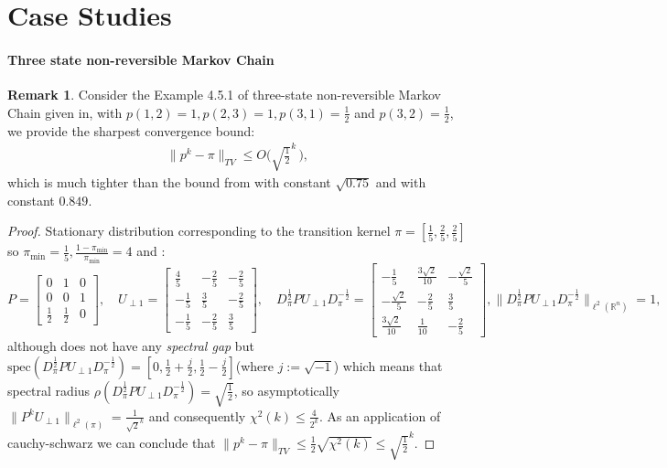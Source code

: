 \documentclass[preprint]{imsart}
\theoremstyle{plain}
\theoremstyle{definition}
\newtheorem{remark}{Remark}
\begin{document}
\section{Case Studies}
\label{sec:case_studies}
\paragraph{Three state non-reversible Markov Chain}
\begin{remark}
\label{rmk:three_state_non_rev}
Consider the Example 4.5.1 of three-state non-reversible Markov Chain given in, \cite{choi2017analysis} with $p(1,2)=1, p(2,3)=1, p(3,1)=\tfrac{1}{2}$ and $p(3,2)=\tfrac{1}{2}$,  
we provide the sharpest convergence bound:
\begin{align}
    \|p^{k}-\pi\|_{TV} \leq O\bigg(\sqrt{\tfrac{1}{2}}^{k} \hspace{2pt} \bigg),
\end{align}
which is much tighter than the bound from \cite{paulin2015concentration} with constant $\sqrt{0.75}$ and \cite{choi2017analysis} with constant $0.849$.
\end{remark}
\begin{proof}
Stationary distribution corresponding to the transition kernel $\pi=[\tfrac{1}{5},\tfrac{2}{5},\tfrac{2}{5}]$ so $\pi_{\min}=\tfrac{1}{5},\tfrac{1-\pi_{\min}}{\pi_{\min}}=4$ and :
\[
P = \begin{bmatrix} 0 & 1 & 0 \\ 0 & 0 & 1 \\ \tfrac{1}{2} & \tfrac{1}{2} & 0 \end{bmatrix}, \quad
U_{\perp 1} = \begin{bmatrix} \tfrac{4}{5} & -\tfrac{2}{5} & -\tfrac{2}{5} \\ -\tfrac{1}{5} & \tfrac{3}{5} & -\tfrac{2}{5} \\ -\tfrac{1}{5} & -\tfrac{2}{5} & \tfrac{3}{5} \end{bmatrix}, \quad
D_{\pi}^{\frac{1}{2}}PU_{\perp 1}D_{\pi}^{-\frac{1}{2}}= \begin{bmatrix} -\tfrac{1}{5} & \tfrac{3\sqrt{2}}{10} & -\tfrac{\sqrt{2}}{5} \\ -\tfrac{\sqrt{2}}{5} & -\tfrac{2}{5} & \tfrac{3}{5} \\ \tfrac{3\sqrt{2}}{10} & \tfrac{1}{10} & -\tfrac{2}{5} \end{bmatrix}  
, \|D_{\pi}^{\frac{1}{2}}PU_{\perp 1}D_{\pi}^{-\frac{1}{2}}\|_{\ell^{2}(\mathbb{R}^{n})}=1,\]
although does not have any \emph{spectral gap} but $\mathrm{spec}(D_{\pi}^{\frac{1}{2}}PU_{\perp 1}D_{\pi}^{-\frac{1}{2}})=[0,\tfrac{1}{2}+\tfrac{j}{2},\tfrac{1}{2}-\tfrac{j}{2}]$(where $j:=\sqrt{-1}$) which means that spectral radius $\rho(D_{\pi}^{\frac{1}{2}}PU_{\perp 1}D_{\pi}^{-\frac{1}{2}})=\sqrt{\tfrac{1}{2}}$, so  asymptotically $\|P^{k}U_{\perp 1}\|_{\ell^{2}(\pi)}=\tfrac{1}{\sqrt{2}^{k}}$ and consequently $\chi^{2}(k) \leq \tfrac{4}{2^{k}}$. As an application of cauchy-schwarz we can conclude that $\|p^{k}-\pi\|_{TV} \leq \frac{1}{2}\sqrt{\chi^{2}(k)}\leq \sqrt{\tfrac{1}{2}}^{k}$.   
\end{proof}
\end{document}
